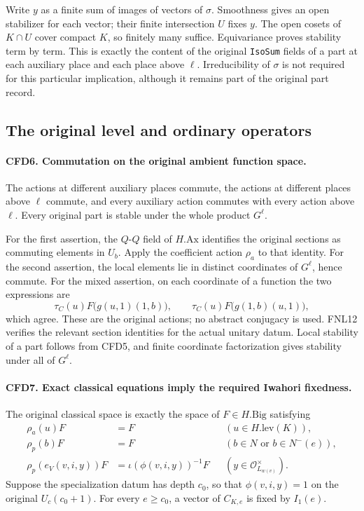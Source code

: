 \documentclass[11pt,a4paper]{article}
\numberwithin{equation}{section}
\theoremstyle{remark}\newtheorem{remark}[theorem]{Remark}
\begin{document}
Write \(y\) as a finite sum of images of vectors of \(\sigma\).
Smoothness gives an open stabilizer for each vector; their finite
intersection \(U\) fixes \(y\).  The open cosets of \(K\cap U\)
cover compact \(K\), so finitely many suffice.  Equivariance proves
stability term by term.  This is exactly the content of the original
\texttt{Iso\allowbreak Sum} fields of a part at each auxiliary place and each place
above \(\ell\).  Irreducibility of \(\sigma\) is not required for
this particular implication, although it remains part of the original
part record.

\subsection{The original level and ordinary operators}

\paragraph{CFD6. Commutation on the original ambient function space.}
\label{claim:CFD6}
The actions at different auxiliary places commute, the actions at
different places above \(\ell\) commute, and every auxiliary action
commutes with every action above \(\ell\).  Every original part is
stable under the whole product \(G^\ell\).

For the first assertion, the \(Q\)-\(Q\) field of \(H.\mathrm{Ax}\)
identifies the original sections as commuting elements in \(U_b\).
Apply the coefficient action \(\rho_a\) to that identity.  For the
second assertion, the local elements lie in distinct coordinates of
\(G^\ell\), hence commute.  For the mixed assertion, on each coordinate
of a function the two expressions are
\[
  \tau_C(u)F\bigl(g(u,1)(1,b)\bigr),\qquad
  \tau_C(u)F\bigl(g(1,b)(u,1)\bigr),
\]
which agree.  These are the original actions; no abstract conjugacy is
used.  FNL12 verifies the relevant section identities for the actual
unitary datum.  Local stability of a part follows from CFD5, and finite
coordinate factorization gives stability under all of \(G^\ell\).

\paragraph{CFD7. Exact classical equations imply the required Iwahori fixedness.}
\label{claim:CFD7}
The original classical space is exactly the space of \(F\in H.\mathrm{Big}\)
satisfying
\begin{align*}
 \rho_a(u)F&=F &&(u\in H.\mathrm{lev}(K)),\\
 \rho_p(b)F&=F &&(b\in N\text{ or }b\in N^-(e)),\\
 \rho_p(e_V(v,i,y))F&=\iota(\phi(v,i,y))^{-1}F
                  &&(y\in\mathcal O_{L_{w(v)}}^\times).
\end{align*}
Suppose the specialization datum has depth \(c_0\), so that
\(\phi(v,i,y)=1\) on the original \(U_c(c_0+1)\).  For every
\(e\ge c_0\), a vector of \(C_{K,e}\) is fixed by \(I_1(e)\).
\end{document}

